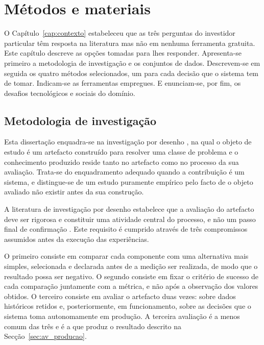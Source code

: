 \chapter{Métodos e materiais}
\label{cap:metodologia}

O Capítulo~\ref{cap:contexto} estabeleceu que as três perguntas do investidor particular têm
resposta na literatura mas não em nenhuma ferramenta gratuita. Este capítulo descreve as opções
tomadas para lhes responder. Apresenta-se primeiro a metodologia de investigação e os conjuntos de
dados. Descrevem-se em seguida os quatro métodos selecionados, um para cada decisão que o sistema
tem de tomar. Indicam-se as ferramentas empregues. E enunciam-se, por fim, os desafios tecnológicos
e sociais do domínio.

\section{Metodologia de investigação}
\label{sec:met_metodologia}

Esta dissertação enquadra-se na investigação por desenho \autocite{hevner2004design}, na qual o
objeto de estudo é um artefacto construído para resolver uma classe de problema e o conhecimento
produzido reside tanto no artefacto como no processo da sua avaliação. Trata-se do enquadramento
adequado quando a contribuição é um sistema, e distingue-se de um estudo puramente empírico pelo
facto de o objeto avaliado não existir antes da sua construção.

A literatura de investigação por desenho estabelece que a avaliação do artefacto deve ser rigorosa
e constituir uma atividade central do processo, e não um passo final de confirmação
\autocite{hevner2004design, peffers2007dsrm}. Este requisito é cumprido através de três
compromissos assumidos antes da execução das experiências.

O primeiro consiste em comparar cada componente com uma alternativa mais simples, selecionada e
declarada antes de a medição ser realizada, de modo que o resultado possa ser negativo. O segundo
consiste em fixar o critério de sucesso de cada comparação juntamente com a métrica, e não após a
observação dos valores obtidos. O terceiro consiste em avaliar o artefacto duas vezes: sobre dados
históricos retidos e, posteriormente, em funcionamento, sobre as decisões que o sistema toma
autonomamente em produção. A terceira avaliação é a menos comum das três e é a que produz o
resultado descrito na Secção~\ref{sec:av_producao}.

